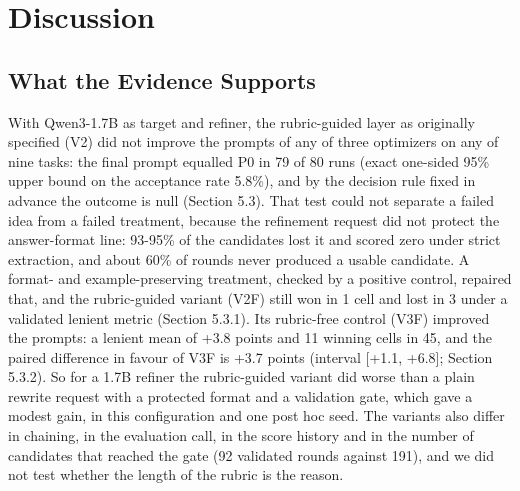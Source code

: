\documentclass{ieeeaccess}
\begin{document}
\section{Discussion}

\subsection{What the Evidence Supports}

With Qwen3-1.7B as target and refiner, the rubric-guided layer as originally specified (V2) did not improve the prompts of any of three optimizers on any of nine tasks: the final prompt equalled P0 in 79 of 80 runs (exact one-sided 95\% upper bound on the acceptance rate 5.8\%), and by the decision rule fixed in advance the outcome is null (Section 5.3). That test could not separate a failed idea from a failed treatment, because the refinement request did not protect the answer-format line: 93-95\% of the candidates lost it and scored zero under strict extraction, and about 60\% of rounds never produced a usable candidate. A format- and example-preserving treatment, checked by a positive control, repaired that, and the rubric-guided variant (V2F) still won in 1 cell and lost in 3 under a validated lenient metric (Section 5.3.1). Its rubric-free control (V3F) improved the prompts: a lenient mean of +3.8 points and 11 winning cells in 45, and the paired difference in favour of V3F is +3.7 points (interval [+1.1, +6.8]; Section 5.3.2). So for a 1.7B refiner the rubric-guided variant did worse than a plain rewrite request with a protected format and a validation gate, which gave a modest gain, in this configuration and one post hoc seed. The variants also differ in chaining, in the evaluation call, in the score history and in the number of candidates that reached the gate (92 validated rounds against 191), and we did not test whether the length of the rubric is the reason.
\end{document}

